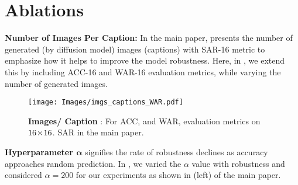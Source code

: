\begin{table}[!t]
\centering
\renewcommand{\arraystretch}{1.2}
\setlength\tabcolsep{6pt}
\centering
{}
\label{tab:idm_inf_dit}  
\end{table}







\section{Ablations}

\noindent \textbf{Number of Images Per Caption:} In the main paper,  presents the number of generated (by diffusion model) images (captions) with SAR-16 metric to emphasize how it helps to improve the model robustness. Here, in \textbf{}, we extend this by including ACC-16 and WAR-16 evaluation metrics, while varying the number of generated images.

\begin{figure}[!t]
\centering
{}
\hfill
\subfloat
{
\texttt{[image: Images/imgs\_captions\_WAR.pdf]}
}
\caption{ 
\textbf{Images/ Caption }: For ACC, and WAR, evaluation metrics on $16\!\times\!16$. SAR in the main paper.
}
\label{fig:ldm_gsize_per}
\end{figure}










\noindent \textbf{Hyperparameter $\mathbf{\alpha}$} signifies the rate of robustness declines as accuracy approaches random prediction. In \textbf{}, we varied the $\alpha$ value with robustness and considered $\alpha=200$ for our experiments as shown in  (left) of the main paper.


